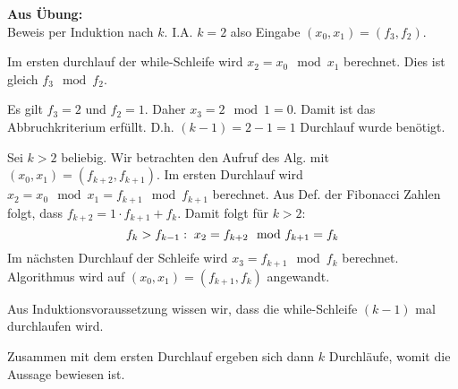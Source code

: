 \textbf{Aus Übung:}\\

Beweis per Induktion nach $k$. I.A. $k=2$ also Eingabe $(x_0, x_1) = (f_3, f_2)$.

Im ersten durchlauf der while-Schleife wird $x_2 = x_0 \mod x_1$ berechnet. Dies ist gleich $f_3  \mod f_2$.

Es gilt $f_3 = 2$ und $f_2 = 1$. Daher $x_3 = 2 \mod 1=0$. Damit ist das Abbruchkriterium erfüllt. D.h. $(k-1) = 2-1 = 1$ Durchlauf wurde benötigt.

Sei $k>2$ beliebig. Wir betrachten den Aufruf des Alg. mit $(x_0, x_1) = (f_{k+2}, f_{k+1})$. Im ersten Durchlauf wird $x_2 = x_0 \mod x_1= f_{k+1} \mod f_{k+1}$ berechnet. Aus Def. der Fibonacci Zahlen folgt, dass $f_{k+2} = 1 \cdot f_{k+1} + f_k$. Damit folgt für $k>2$:
\[
   f_{k}>f_{k-1}: \; x_2 = f_{k+2} \mod f_{k+1} = f_k \\
 \]
 Im nächsten Durchlauf der Schleife wird $x_3 = f_{k+1} \mod f_k $ berechnet. Algorithmus wird auf $(x_0, x_1) = (f_{k+1}, f_k)$ angewandt.

 Aus Induktionsvoraussetzung wissen wir, dass die while-Schleife $(k-1)$ mal durchlaufen wird.

 Zusammen mit dem ersten Durchlauf ergeben sich dann $k$ Durchläufe, womit die Aussage bewiesen ist.
